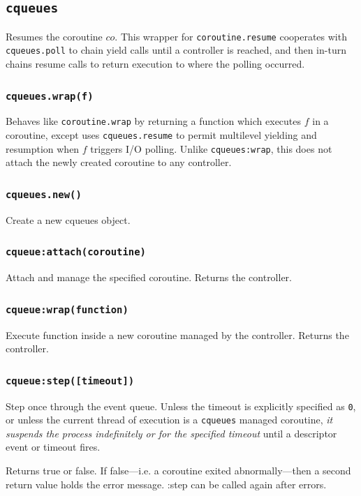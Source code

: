 \documentclass[11pt, oneside]{memoir}
\newcommand*{\cqueues}[0]{\texttt{cqueues}\xspace}
\newcommand*{\routine}[1]{\texttt{#1}\xspace}
\newcounter{toccols}
\newenvironment{Module}[1]{
	\subsection{\texttt{#1}}
	\addtocontents{toc}{
		\protect\begin{multicols}{\value{toccols}}
	}
}{
	\addtocontents{toc}{\protect\end{multicols}}
}
\begin{document}
\begin{Module}{\cqueues}
Resumes the coroutine $co$. This wrapper for \routine{coroutine.resume} cooperates with \routine{cqueues.poll} to chain yield calls until a controller is reached, and then in-turn chains resume calls to return execution to where the polling occurred.

\subsubsection[\routine{cqueues.wrap}]{\routine{cqueues.wrap(f)}}

Behaves like \routine{coroutine.wrap} by returning a function which executes $f$ in a coroutine, except uses \routine{cqueues.resume} to permit multilevel yielding and resumption when $f$ triggers I/O polling. Unlike \routine{cqueues:wrap}, this does not attach the newly created coroutine to any controller.

\subsubsection[\routine{cqueues.new}]{\routine{cqueues.new()}}
Create a new cqueues object.

\subsubsection[\routine{cqueues:attach}]{\routine{cqueue:attach(coroutine)}}
Attach and manage the specified coroutine. Returns the controller.

\subsubsection[\routine{cqueues:wrap}]{\routine{cqueue:wrap(function)}}
Execute function inside a new coroutine managed by the controller. Returns the controller.

\subsubsection[\routine{cqueues:step}]{\routine{cqueue:step([timeout])}}
Step once through the event queue. Unless the timeout is explicitly specified as \texttt{0}, or unless the current thread of execution is a \cqueues managed coroutine, \emph{it suspends the process indefinitely or for the specified timeout} until a descriptor event or timeout fires.

Returns true or false. If false---i.e. a coroutine exited abnormally---then a second return value holds the error message. :step can be called again after errors.


\end{Module}
\end{document}
